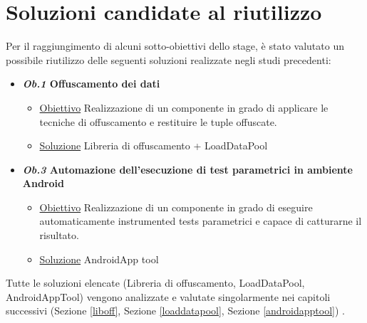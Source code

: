 \section{Soluzioni candidate al riutilizzo}
\noindent Per il raggiungimento di alcuni sotto-obiettivi dello stage, è stato valutato un possibile riutilizzo delle seguenti soluzioni realizzate negli studi precedenti:
\bigskip
\begin{itemize}[nosep]

\item[]\textbf{\emph{Ob.1} Offuscamento dei dati} \

\begin{itemize}[nosep]
\item[] \ul{Obiettivo}  Realizzazione di un componente in grado di applicare le tecniche di offuscamento e restituire le tuple offuscate.
\item[]  \ul{Soluzione}  Libreria di offuscamento + LoadDataPool
\end{itemize}


\smallskip
\item[]\textbf{\emph{Ob.3} Automazione dell'esecuzione di test parametrici in ambiente Android}
\begin{itemize}[nosep]
\item[] \ul{Obiettivo}  Realizzazione di un componente in grado di eseguire automaticamente instrumented tests parametrici e capace di catturarne il risultato. 
\item[]  \ul{Soluzione}  AndroidApp tool
\end{itemize}
\end{itemize}
\bigskip
\noindent Tutte le soluzioni elencate (Libreria di offuscamento, LoadDataPool, AndroidAppTool) vengono analizzate e valutate singolarmente nei capitoli successivi (Sezione \ref{liboff}, Sezione \ref{loaddatapool}, Sezione \ref{androidapptool}) . 


